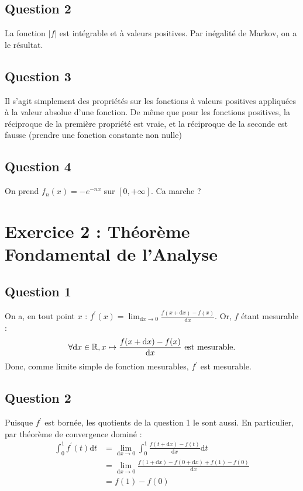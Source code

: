 \documentclass{cours}
\begin{document}
\subsection{Question 2}
    La fonction $\left|f\right|$ est intégrable et à valeurs positives. Par inégalité de Markov, on a le résultat.

\subsection{Question 3}
    Il s'agit simplement des propriétés sur les fonctions à valeurs positives appliquées à la valeur absolue d'une fonction. De même que pour les fonctions positives, la réciproque de la première propriété est vraie, et la réciproque de la seconde est fausse (prendre une fonction constante non nulle)

\subsection{Question 4}
    On prend $f_{n}(x) = -e^{-nx}$ sur $\left[0, +\infty\right]$. Ca marche ?

\section{Exercice 2 : Théorème Fondamental de l'Analyse}
\subsection{Question 1}
    On a, en tout point $x$ : $f^{'}(x) = \lim_{\mathrm{d}x \to 0} \frac{f(x + \mathrm{d}x) - f(x)}{\mathrm{d}x}$. Or, $f$ étant mesurable : \[
        \forall \mathrm{d}x \in \mathbb{R}, x \mapsto \frac{f(x + \mathrm{d}x) - f(x)}{\mathrm{d}x}  \text{ est mesurable.}
    \]
    Donc, comme limite simple de fonction mesurables, $f^{'}$ est mesurable. 

\subsection{Question 2}
    Puisque $f^{'}$ est bornée, les quotients de la question 1 le sont aussi. En particulier, par théorème de convergence dominé : \[
        \begin{aligned}
        \int_{0}^{1} f^{'}(t) \mathrm{d}t &= \lim_{\mathrm{d}x \to 0} \int_{0}^{1} \frac{f(t + \mathrm{d}x) - f(t)}{\mathrm{d}x} \mathrm{d}t\\
        &= \lim_{\mathrm{d}x \to 0} \frac{f(1 + \mathrm{d}x) - f(0 + \mathrm{d}x) + f(1) - f(0)}{\mathrm{d}x} \\
        &= f(1) - f(0)\\
    \end{aligned}  
    \]
\end{document}
